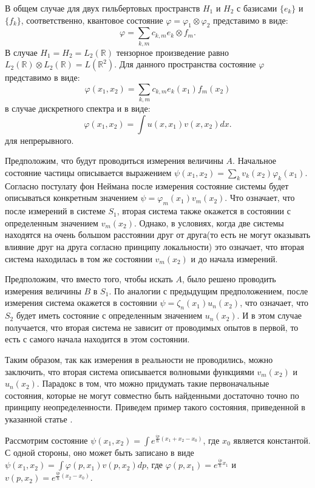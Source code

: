\documentclass[%
master,         %
subf,           %
href,           %
,times         %
]{disser}
\numberwithin{equation}{section}
\numberwithin{figure}{section}
\begin{document}
В общем случае для двух гильбертовых пространств $H_1$ и $H_2$ с базисами $\{e_k\}$ и $\{f_k\}$, соответственно, квантовое состояние $\varphi = \varphi_1\otimes\varphi_2$ представимо в виде:
\[
\varphi = \sum_{k, m}c_{k, m}e_k\otimes f_m.
\]
В случае  $H_1 = H_2 = L_2(\mathbb{R})$ тензорное произведение равно $L_2(\mathbb{R})\otimes L_2(\mathbb{R}) = L(\mathbb{R}^2)$. Для данного пространства состояние $\varphi$ представимо в виде:
\[
\varphi (x_1, x_2) = \sum_{k, m}c_{k, m}e_k(x_1)f_m(x_2)
\]
в случае дискретного спектра и в виде:
\[
\varphi (x_1, x_2) = \int u(x, x_1)v(x, x_2)dx.
\]
для непрерывного.

Предположим, что будут проводиться измерения величины $A$. Начальное состояние частицы описывается выражением  $\psi(x_1, x_2) = \sum_k v_k(x_2)\varphi_k(x_1)$. Согласно постулату фон Неймана после измерения состояние системы будет описываться конкретным значением $\psi = \varphi_m(x_1)v_m(x_2)$. Что означает, что после измерений в системе $S_1$, вторая система также окажется в состоянии с определенным значением $v_m(x_2)$. Однако, в условиях, когда две системы  находятся на очень большом расстоянии друг от друга(то есть не могут оказывать влияние друг на друга согласно принципу локальности) это означает, что вторая система находилась в том же состоянии $v_m(x_2)$ и до начала измерений.

Предположим, что вместо того, чтобы искать $A$, было решено проводить измерения величины  $B$ в $S_1$. По аналогии с предыдущим предположением, после измерения система окажется в состоянии $\psi = \zeta_n(x_1)u_n(x_2)$, что означает, что $S_2$ будет иметь состояние с определенным значением $u_n(x_2)$. И в этом случае получается, что вторая система не зависит от проводимых опытов в первой, то есть с самого начала находится в этом состоянии. 

Таким образом, так как измерения в реальности не проводились, можно заключить, что вторая система описывается волновыми функциями $v_m(x_2)$ и $u_n(x_2)$. Парадокс в том, что можно придумать такие первоначальные состояния, которые не могут совместно быть найденными достаточно точно по принципу неопределенности. Приведем пример такого состояния, приведенной в  указанной статье \cite{EPR}.

Рассмотрим состояние $\psi(x_1, x_2) = \int e^{\frac{ip}{\hbar}(x_1+x_2-x_0)}$, где $x_0$ является константой. С одной стороны, оно может быть записано в виде $\psi(x_1, x_2) = \int\varphi(p, x_1)v(p, x_2)dp$, где $\varphi(p, x_1) = e^{\frac{ip}{\hbar}x_1}$ и $v(p, x_2) = e^{\frac{ip}{\hbar}(x_2-x_0)}$. 
\end{document}
